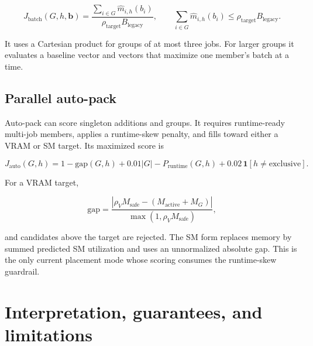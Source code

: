 \documentclass[11pt]{article}
\begin{document}
\begin{equation}
  J_{\mathrm{batch}}(G,h,\boldsymbol b)
  =\frac{\sum_{i\in G}\widehat m_{i,h}(b_i)}
         {\rho_{\mathrm{target}}B_{\mathrm{legacy}}},
  \qquad
  \sum_{i\in G}\widehat m_{i,h}(b_i)
  \le\rho_{\mathrm{target}}B_{\mathrm{legacy}}.
  \label{eq:batch-optimized-score}
\end{equation}

It uses a Cartesian product for groups of at most three jobs.  For larger
groups it evaluates a baseline vector and vectors that maximize one member's
batch at a time.

\subsection{Parallel auto-pack}

Auto-pack can score singleton additions and groups.  It requires runtime-ready
multi-job members, applies a runtime-skew penalty, and fills toward either a
VRAM or SM target.  Its maximized score is

\begin{equation}
  J_{\mathrm{auto}}(G,h)
  =1-\mathrm{gap}(G,h)+0.01|G|-P_{\mathrm{runtime}}(G,h)
   +0.02\,\mathbf{1}[h\ne\mathrm{exclusive}].
  \label{eq:auto-score}
\end{equation}

For a VRAM target,

\begin{equation}
  \mathrm{gap}
  =\frac{|\rho_VM_{\mathrm{safe}}-(M_{\mathrm{active}}+M_G)|}
         {\max(1,\rho_VM_{\mathrm{safe}})},
\end{equation}

and candidates above the target are rejected.  The SM form replaces memory by
summed predicted SM utilization and uses an unnormalized absolute gap.  This is
the only current placement mode whose scoring consumes the runtime-skew
guardrail.

\section{Interpretation, guarantees, and limitations}
\end{document}
